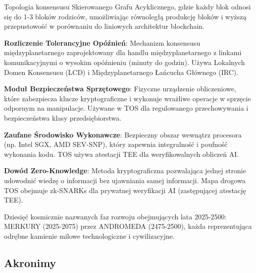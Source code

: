 \documentclass[11pt]{article}
\begin{document}
\begin{description}[leftmargin=3cm, style=nextline]
  \item[BlockDAG] Topologia konsensusu Skierowanego Grafu Acyklicznego, gdzie każdy blok odnosi się do 1-3 bloków rodziców, umożliwiając równoległą produkcję bloków i wyższą przepustowość w porównaniu do liniowych architektur blockchain.

  \item[DT-Settlement] \textbf{Rozliczenie Tolerancyjne Opóźnień}: Mechanizm konsensusu międzyplanetarnego zaprojektowany dla handlu międzyplanetarnego z linkami komunikacyjnymi o wysokim opóźnieniu (minuty do godzin). Używa Lokalnych Domen Konsensusu (LCD) i Międzyplanetarnego Łańcucha Głównego (IRC).

  \item[HSM] \textbf{Moduł Bezpieczeństwa Sprzętowego}: Fizyczne urządzenie obliczeniowe, które zabezpiecza klucze kryptograficzne i wykonuje wrażliwe operacje w sprzęcie odpornym na manipulacje. Używane w TOS dla regulowanego przechowywania i bezpieczeństwa klasy przedsiębiorstwa.

  \item[TEE] \textbf{Zaufane Środowisko Wykonawcze}: Bezpieczny obszar wewnątrz procesora (np. Intel SGX, AMD SEV-SNP), który zapewnia integralność i poufność wykonania kodu. TOS używa atestacji TEE dla weryfikowalnych obliczeń AI.

  \item[Dowód ZK] \textbf{Dowód Zero-Knowledge}: Metoda kryptograficzna pozwalająca jednej stronie udowodnić wiedzę o informacji bez ujawniania samej informacji. Mapa drogowa TOS obejmuje zk-SNARKs dla prywatnej weryfikacji AI (zastępującej atestację TEE).

  \item[Ery Niebiańskie] Dziesięć kosmicznie nazwanych faz rozwoju obejmujących lata 2025-2500: MERKURY (2025-2075) przez ANDROMEDA (2475-2500), każda reprezentująca odrębne kamienie milowe technologiczne i cywilizacyjne.
\end{description}

\subsection*{Akronimy}
\end{document}
